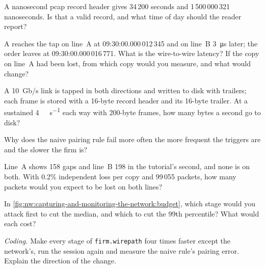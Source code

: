 \begin{exercise}[$\star$]\label{exo:nw:capturing-and-monitoring-the-network:1}
A nanosecond pcap record header gives 34\,200 seconds and 1\,500\,000\,321 nanoseconds. Is that a valid record, and what time of day
should the reader report?
\end{exercise}

\begin{exercise}[$\star$]\label{exo:nw:capturing-and-monitoring-the-network:2}
A  reaches the tap on line~A at 09:30:00.000\,012\,345 and on line~B \qty{3}{\micro\second} later; the order leaves at
09:30:00.000\,016\,771. What is the wire-to-wire latency? If the copy on line~A had been lost, from which copy would you measure, and
what would change?
\end{exercise}

\begin{exercise}[$\star$]\label{exo:nw:capturing-and-monitoring-the-network:3}
A 10~Gb/s link is tapped in both directions and written to disk with trailers; each frame is stored with a 16-byte record header and
its 16-byte trailer. At a sustained \qty{4}{\giga\bit\per\second} each way with 200-byte frames, how many bytes a second go to disk?
\end{exercise}

\begin{exercise}[$\star\star$]\label{exo:nw:capturing-and-monitoring-the-network:4}
Why does the naive pairing rule fail more often the more frequent the triggers are and the slower the firm is?
\end{exercise}

\begin{exercise}[$\star\star$]\label{exo:nw:capturing-and-monitoring-the-network:5}
Line~A shows 158 gaps and line~B 198 in the tutorial's second, and none is on both. With 0.2\% independent loss per copy and 99\,055
packets, how many packets would you expect to be lost on both lines?
\end{exercise}

\begin{exercise}[$\star\star$]\label{exo:nw:capturing-and-monitoring-the-network:6}
In \cref{fig:nw:capturing-and-monitoring-the-network:budget}, which stage would you attack first to cut the median, and which to cut the 99th
percentile? What would each cost?
\end{exercise}

\begin{exercise}[$\star\star\star$]\label{exo:nw:capturing-and-monitoring-the-network:7}
\emph{Coding.} Make every stage of \texttt{firm.wirepath} four times faster except the network's, run the session again and measure the naive
rule's pairing error. Explain the direction of the change.
\end{exercise}

